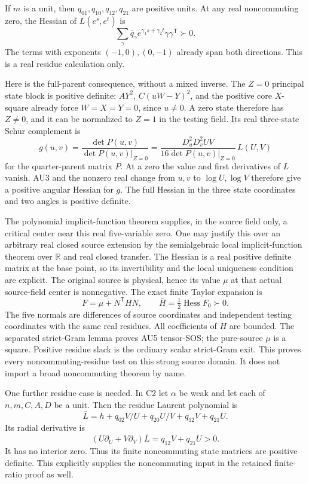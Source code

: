 If \(m\) is a unit, then \(q_{01},q_{10},q_{12},q_{21}\) are
positive units. At any real noncommuting zero, the Hessian of
\(L(e^s,e^t)\) is
\[
 \sum_{\gamma} \bar q_\gamma
             e^{\gamma_1s+\gamma_2t}\gamma\gamma^{\mathsf T}
 \succ0 .
 \tag{AU3}
\]
The terms with exponents \((-1,0),(0,-1)\) already span both
directions. This is a real residue calculation only.

Here is the full-parent consequence, without a mixed inverse.
The \(Z=0\) principal state block is positive definite:
\(A Y^2\), \(C(uW-Y)^2\), and the positive core \(X\)-square
already force \(W=X=Y=0\), since \(u\ne0\).
A zero state therefore has \(Z\ne0\), and it can be normalized
to \(Z=1\) in the testing field. Its real three-state Schur
complement is
\[
 g(u,v)=\frac{\det P(u,v)}
                 {\det P(u,v)|_{Z=0}}
 =\frac{D_u^2D_v^2UV}{16\det P(u,v)|_{Z=0}}\,L(U,V)
 \tag{AU4}
\]
for the quarter-parent matrix \(P\).
At a zero the value and first derivatives of \(L\) vanish.
AU3 and the nonzero real change from \(u,v\) to \(\log U,\log V\)
therefore give a positive angular Hessian for \(g\).
The full Hessian in the three state coordinates and two angles
is positive definite.

The polynomial implicit-function theorem supplies, in the source
field only, a critical center near this real five-variable zero.
One may justify this over an arbitrary real closed source extension
by the semialgebraic local implicit-function theorem over
\(\mathbb R\) and real closed transfer. The Hessian is a real
positive definite matrix at the base point, so its invertibility
and the local uniqueness condition are explicit.
The original source is physical, hence its value \(\mu\) at
that actual source-field center is nonnegative.
The exact finite Taylor expansion is
\[
 F=\mu+N^{\mathsf T}HN,\qquad
 \bar H=\tfrac12\operatorname{Hess}F_0\succ0 .
 \tag{AU5}
\]
The five normals are differences of source coordinates and
independent testing coordinates with the same real residues.
All coefficients of \(H\) are bounded. The separated strict-Gram
lemma proves AU5 tensor-SOS; the pure-source \(\mu\) is a square.
Positive residue slack is the ordinary scalar strict-Gram exit.
This proves every noncommuting-residue test on this strong source
domain. It does not import a broad noncommuting theorem by name.

One further residue case is needed.
In C2 let \(\alpha\) be weak and let each of \(n,m,C,A,D\) be a unit.
Then
the residue Laurent polynomial is
\[
 \bar L=h+q_{02}V/U+q_{20}U/V+q_{12}V+q_{21}U .
\]
Its radial derivative is
\[
 (U\partial_U+V\partial_V)\bar L=q_{12}V+q_{21}U>0.
 \tag{AU6}
\]
It has no interior zero. Thus its finite noncommuting state
matrices are positive definite. This explicitly supplies the
noncommuting input in the retained finite-ratio proof as well.

